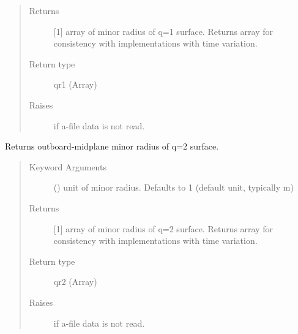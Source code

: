 \documentclass[letterpaper,10pt,english]{sphinxmanual}
\begin{document}
\begin{fulllineitems}
\begin{fulllineitems}
\begin{quote}
\begin{description}
\item[{Returns}] \leavevmode
{[}1{]} array of minor radius of q=1 surface.  Returns
array for consistency with
{\hyperref[\detokenize{eqtools:eqtools.core.Equilibrium}]{}}
implementations with time variation.

\item[{Return type}] \leavevmode
qr1 (Array)

\item[{Raises}] \leavevmode
{} \textendash{} if a-file data is not read.

\end{description}\end{quote}

\end{fulllineitems}


\begin{fulllineitems}
\label{\detokenize{eqtools:eqtools.eqdskreader.EqdskReader.getQ2Surf}}
Returns outboard-midplane minor radius of q=2 surface.
\begin{quote}\begin{description}
\item[{Keyword Arguments}] \leavevmode
{} () \textendash{} unit of minor radius.  Defaults to 1
(default unit, typically m)

\item[{Returns}] \leavevmode
{[}1{]} array of minor radius of q=2 surface.  Returns
array for consistency with
{\hyperref[\detokenize{eqtools:eqtools.core.Equilibrium}]{}}
implementations with time variation.

\item[{Return type}] \leavevmode
qr2 (Array)

\item[{Raises}] \leavevmode
{} \textendash{} if a-file data is not read.

\end{description}\end{quote}


\end{fulllineitems}
\end{fulllineitems}
\end{document}
